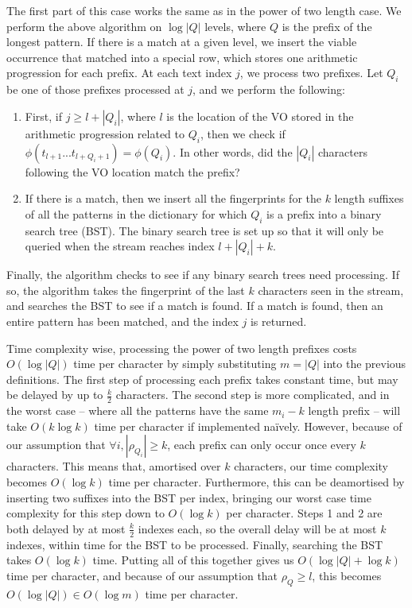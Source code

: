\documentclass[ %
                    author={Dominic Joseph Moylett},
                    degree={MEng},
                     title={Dictionary Matching with Fingerprints},
                  subtitle={An Empirical Analysis},
                      type={Research},
                      year={2014} ]{dissertation}
\begin{document}
The first part of this case works the same as in the power of two length case. We perform the above algorithm on $\log|Q|$ levels, where $Q$ is the prefix of the longest pattern. If there is a match at a given level, we insert the viable occurrence that matched into a special row, which stores one arithmetic progression for each prefix. At each text index $j$, we process two prefixes. Let $Q_i$ be one of those prefixes processed at $j$, and we perform the following:

\begin{enumerate}
  \item First, if $j \geq l + |Q_i|$, where $l$ is the location of the VO stored in the arithmetic progression related to $Q_i$, then we check if $\phi(t_{l+1}...t_{l+Q_i+1}) = \phi(Q_i)$. In other words, did the $|Q_i|$ characters following the VO location match the prefix?
  \item If there is a match, then we insert all the fingerprints for the $k$ length suffixes of all the patterns in the dictionary for which $Q_i$ is a prefix into a binary search tree (BST). The binary search tree is set up so that it will only be queried when the stream reaches index $l + |Q_i| + k$.
\end{enumerate}

Finally, the algorithm checks to see if any binary search trees need processing. If so, the algorithm takes the fingerprint of the last $k$ characters seen in the stream, and searches the BST to see if a match is found. If a match is found, then an entire pattern has been matched, and the index $j$ is returned.

Time complexity wise, processing the power of two length prefixes costs $O(\log|Q|)$ time per character by simply substituting $m = |Q|$ into the previous definitions. The first step of processing each prefix takes constant time, but may be delayed by up to $\frac{k}{2}$ characters. The second step is more complicated, and in the worst case -- where all the patterns have the same $m_i - k$ length prefix -- will take $O(k\log k)$ time per character if implemented na\"{i}vely. However, because of our assumption that $\forall i, |\rho_{Q_i}| \geq k$, each prefix can only occur once every $k$ characters. This means that, amortised over $k$ characters, our time complexity becomes $O(\log k)$ time per character. Furthermore, this can be deamortised by inserting two suffixes into the BST per index, bringing our worst case time complexity for this step down to $O(\log k)$ per character. Steps 1 and 2 are both delayed by at most $\frac{k}{2}$ indexes each, so the overall delay will be at most $k$ indexes, within time for the BST to be processed. Finally, searching the BST takes $O(\log k)$ time. Putting all of this together gives us $O(\log|Q| + \log k)$ time per character, and because of our assumption that $\rho_Q \geq l$, this becomes $O(\log|Q|) \in O(\log m)$ time per character.
\end{document}
